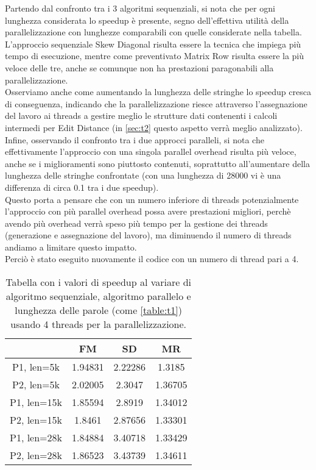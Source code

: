 \documentclass[10pt,twocolumn,letterpaper]{article}
\begin{document}
Partendo dal confronto tra i 3 algoritmi sequenziali, si nota che per ogni lunghezza considerata lo speedup è presente, segno dell'effettiva utilità della parallelizzazione con lunghezze comparabili con quelle considerate nella tabella. L'approccio sequenziale Skew Diagonal risulta essere la tecnica che impiega più tempo di esecuzione, mentre come preventivato Matrix Row risulta essere la più veloce delle tre, anche se comunque non ha prestazioni paragonabili alla parallelizzazione.\\
Osserviamo anche come aumentando la lunghezza delle stringhe lo speedup cresca di conseguenza, indicando che la parallelizzazione riesce attraverso l'assegnazione del lavoro ai threads a gestire meglio le strutture dati contenenti i calcoli intermedi per Edit Distance (in \cref{sec:t2} questo aspetto verrà meglio analizzato).
Infine, osservando il confronto tra i due approcci paralleli, si nota che effettivamente l'approccio con una singola parallel overhead risulta più veloce, anche se i miglioramenti sono piuttosto contenuti, soprattutto all'aumentare della lunghezza delle stringhe confrontate (con una lunghezza di 28000 vi è una differenza di circa 0.1 tra i due speedup).\\
Questo porta a pensare che con un numero inferiore di threads potenzialmente l'approccio con più parallel overhead possa avere prestazioni migliori, perchè avendo più overhead verrà speso più tempo per la gestione dei threads (generazione e assegnazione del lavoro), ma diminuendo il numero di threads andiamo a limitare questo impatto.\\
Perciò è stato eseguito nuovamente il codice con un numero di thread pari a 4.

\begin{table}[h]
\centering
\begin{tabular}{ |c|c|c|c| } 
\hline
 & FM & SD & MR\\
\hline
P1, len=5k & 1.94831 & 2.22286 & 1.3185\\
\hline
P2, len=5k & 2.02005 & 2.3047 & 1.36705\\
\hline
P1, len=15k & 1.85594 & 2.8919 & 1.34012\\
\hline
P2, len=15k & 1.8461 & 2.87656 & 1.33301\\
\hline
P1, len=28k & 1.84884 & 3.40718 & 1.33429\\
\hline
P2, len=28k & 1.86523 & 3.43739 & 1.34611\\
\hline
\end{tabular}
\vspace*{3mm}
\caption{Tabella con i valori di speedup al variare di algoritmo sequenziale, algoritmo parallelo e lunghezza delle parole (come \cref{table:t1}) usando 4 threads per la parallelizzazione.}
\label{table:t2}
\end{table}
\end{document}
